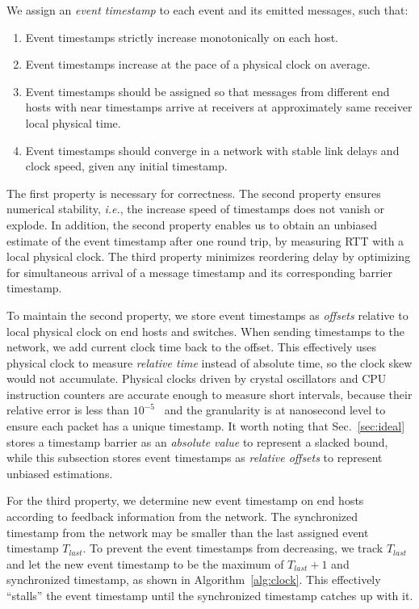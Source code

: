 We assign an \textit{event timestamp} to each event and its emitted messages, such that:
\begin{enumerate}
\item Event timestamps strictly increase monotonically on each host.
\item Event timestamps increase at the pace of a physical clock on average.
\item Event timestamps should be assigned so that messages from different end hosts with near timestamps arrive at receivers at approximately same receiver local physical time.
\item Event timestamps should converge in a network with stable link delays and clock speed, given any initial timestamp.
\end{enumerate}

The first property is necessary for correctness. The second property ensures numerical stability, \textit{i.e.}, the increase speed of timestamps does not vanish or explode. In addition, the second property enables us to obtain an unbiased estimate of the event timestamp after one round trip, by measuring RTT with a local physical clock. The third property minimizes reordering delay by optimizing for simultaneous arrival of a message timestamp and its corresponding barrier timestamp.

To maintain the second property, we store event timestamps as \textit{offsets} relative to local physical clock on end hosts and switches. When sending timestamps to the network, we add current clock time back to the offset.
This effectively uses physical clock to measure \textit{relative time} instead of absolute time, so the clock skew would not accumulate. Physical clocks driven by crystal oscillators and CPU instruction counters are accurate enough to measure short intervals, because their relative error is less than $10^{-5}$~\cite{corbett2013spanner} and the granularity is at nanosecond level to ensure each packet has a unique timestamp.
It worth noting that Sec.~\ref{sec:ideal} stores a timestamp barrier as an \textit{absolute value} to represent a slacked bound, while this subsection stores event timestamps as \textit{relative offsets} to represent unbiased estimations.

For the third property, we determine new event timestamp on end hosts according to feedback information from the network.
The synchronized timestamp from the network may be smaller than the last assigned event timestamp $T_{last}$. To prevent the event timestamps from decreasing, we track $T_{last}$ and let the new event timestamp to be the maximum of $T_{last} + 1$ and synchronized timestamp, as shown in Algorithm~\ref{alg:clock}. This effectively ``stalls'' the event timestamp until the synchronized timestamp catches up with it.

